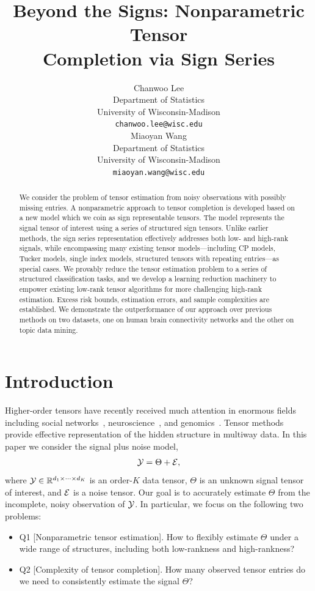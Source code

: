 \documentclass{article}
\title{Beyond the Signs: Nonparametric Tensor \\
Completion via Sign Series}
\author{%
 Chanwoo Lee\\
  Department of Statistics\\
  University of Wisconsin-Madison\\
  \texttt{chanwoo.lee@wisc.edu} \\
   \And Miaoyan Wang \\
  Department of Statistics\\ 
   University of Wisconsin-Madison\\
   \texttt{miaoyan.wang@wisc.edu} \\
}
\theoremstyle{plain}
\theoremstyle{definition}
\begin{document}
\maketitle

\begin{abstract}
We consider the problem of tensor estimation from noisy observations with possibly missing entries. A nonparametric approach to tensor completion is developed based on a new model which we coin as sign representable tensors. The model represents the signal tensor of interest using a series of structured sign tensors. Unlike earlier methods, the sign series representation effectively addresses both low- and high-rank signals, while encompassing many existing tensor models---including CP models, Tucker models, single index models, structured tensors with repeating entries---as special cases. We provably reduce the tensor estimation problem to a series of structured classification tasks, and we develop a learning reduction machinery to empower existing low-rank tensor algorithms for more challenging high-rank estimation. Excess risk bounds, estimation errors, and sample complexities are established. We demonstrate the outperformance of our approach over previous methods on two datasets, one on human brain connectivity networks and the other on topic data mining. 
\end{abstract}

\section{Introduction}\label{sec:intro}

Higher-order tensors have recently received much attention in enormous fields including social networks~\citep{anandkumar2014tensor}, neuroscience~\citep{wang2017bayesian}, and genomics~\citep{hore2016tensor}. Tensor methods provide effective representation of the hidden structure in multiway data. In this paper we consider the signal plus noise model,
\vspace{-.2cm}
\begin{equation}\label{eq:modelintro}
\mathcal{Y}=\Theta+\mathcal{E},
\end{equation}
where $\mathcal{Y}\in\mathbb{R}^{d_1\times \cdots \times d_K}$ is an order-$K$ data tensor, $\Theta$ is an unknown signal tensor of interest, and $\mathcal{E}$ is a noise tensor. Our goal is to accurately estimate $\Theta$ from the incomplete, noisy observation of $\mathcal{Y}$. In particular, we focus on the following two problems:
\begin{itemize}[leftmargin=*,labelindent=-10pt]
\item[] Q1 [Nonparametric tensor estimation]. How to flexibly estimate $\Theta$ under a wide range of structures, including both low-rankness and high-rankness?
\item[] Q2 [Complexity of tensor completion]. How many observed tensor entries do we need to consistently estimate the signal $\Theta$?
\end{itemize}
\end{document}
